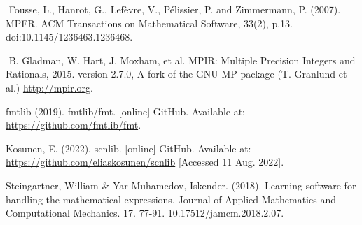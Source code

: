 \documentclass[12pt]{article}
\begin{document}
\begin{thebibliography}{X}
‌ Fousse, L., Hanrot, G., Lefèvre, V., Pélissier, P. and Zimmermann, P. (2007). MPFR. ACM Transactions on Mathematical Software, 33(2), p.13. doi:10.1145/1236463.1236468.

‌ B. Gladman, W. Hart, J. Moxham, et al. MPIR: Multiple Precision Integers and Rationals, 2015. version 2.7.0, A fork of the GNU MP package (T. Granlund et al.) \href{http://mpir.org}{http://mpir.org}.

 fmtlib (2019). fmtlib/fmt. [online] GitHub. Available at: \href{https://github.com/fmtlib/fmt}{https://github.com/fmtlib/fmt}.

 Kosunen, E. (2022). scnlib. [online] GitHub. Available at: \href{https://github.com/eliaskosunen/scnlib}{https://github.com/eliaskosunen/scnlib} [Accessed 11 Aug. 2022].‌

 Steingartner, William \& Yar-Muhamedov, Iskender. (2018). Learning software for handling the mathematical expressions. Journal of Applied Mathematics and Computational Mechanics. 17. 77-91. 10.17512/jamcm.2018.2.07. 

\end{thebibliography}
\end{document}
